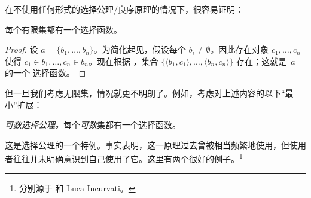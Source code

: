 \documentclass[../../../include/open-logic-section]{subfiles}
\begin{document}

在不使用任何形式的选择公理/良序原理的情况下，很容易证明：

\begin{lem}[在 $\Zminus$ 中]
每个有限集都有一个选择函数。
\end{lem}

\begin{proof}
设 $a = \{b_1, \ldots, b_n\}$。为简化起见，假设每个 $b_i
\neq \emptyset$。因此存在对象 $c_1, \ldots, c_n$ 使得
$c_1 \in b_1, \ldots, c_n \in b_n$。现在根据
，集合 $\{\langle b_1,
c_1\rangle , \ldots, \langle b_n, c_n\rangle\}$ 存在；这就是~$a$ 的一个
选择函数。
\end{proof}

但一旦我们考虑无限集，情况就更不明朗了。例如，考虑对上述内容的以下“最小”扩展：

\begin{defish}
\emph{可数选择公理。}每个\emph{可数}集都有一个选择函数。
\end{defish}

这是选择公理的一个特例。事实表明，这一原理过去曾被相当频繁地使用，但使用者往往并未明确意识到自己使用了它。这里有两个很好的例子。\footnote{分别源于
\citet[\S9.4]{Potter2004} 和 Luca Incurvati。}
\end{document}
